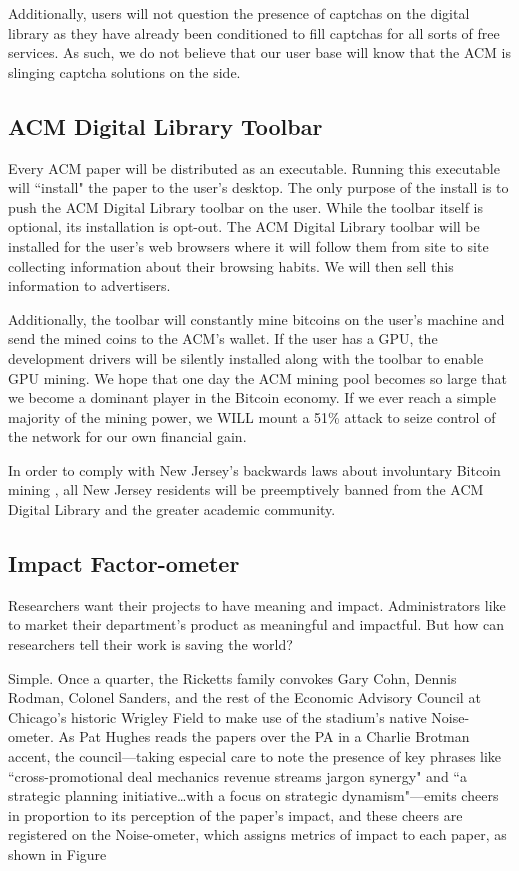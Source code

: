 Additionally, users will not question the presence of captchas on the digital
library as they have already been conditioned to fill captchas for all sorts of
free services.
As such, we do not believe that our user base will know that the ACM is
slinging captcha solutions on the side.

\subsection{ACM Digital Library Toolbar}
Every ACM paper will be distributed as an executable.
Running this executable will ``install" the paper to the user's desktop.
The only purpose of the install is to push the ACM Digital Library toolbar on
the user.
While the toolbar itself is optional, its installation is opt-out.
The ACM Digital Library toolbar will be installed for the user's web browsers where it
will follow them from site to site collecting information about their browsing
habits.
We will then sell this information to advertisers.

Additionally, the toolbar will constantly mine bitcoins on the user's machine
and send the mined coins to the ACM's wallet.
If the user has a GPU, the development drivers will be silently installed along
with the toolbar to enable GPU mining.
We hope that one day the ACM mining pool becomes so large that we become a
dominant player in the Bitcoin economy.
If we ever reach a simple majority of the mining power, we WILL mount a 51\%
attack to seize control of the network for our own financial gain.

In order to comply with New Jersey's backwards laws about involuntary Bitcoin
mining \cite{tidbit}, all New Jersey residents will be preemptively banned from
the ACM Digital Library and the greater academic community.

\subsection{Impact Factor-ometer}

Researchers want their projects to have meaning and impact. Administrators like to market their department's product as meaningful and impactful. But how can researchers tell their work is saving the world?

Simple. Once a quarter, the Ricketts family convokes Gary Cohn, Dennis Rodman, Colonel Sanders, and the rest of the Economic Advisory Council at Chicago's historic Wrigley Field to make use of the stadium's native Noise-ometer. As Pat Hughes reads the papers over the PA in a Charlie Brotman accent, the council---taking especial care to note the presence of key phrases like ``cross-promotional deal mechanics revenue streams jargon synergy" and ``a strategic planning initiative\ldots with a focus on strategic dynamism"---emits cheers in proportion to its perception of the paper's impact, and these cheers are registered on the Noise-ometer, which assigns metrics of impact to each paper, as shown in Figure 


